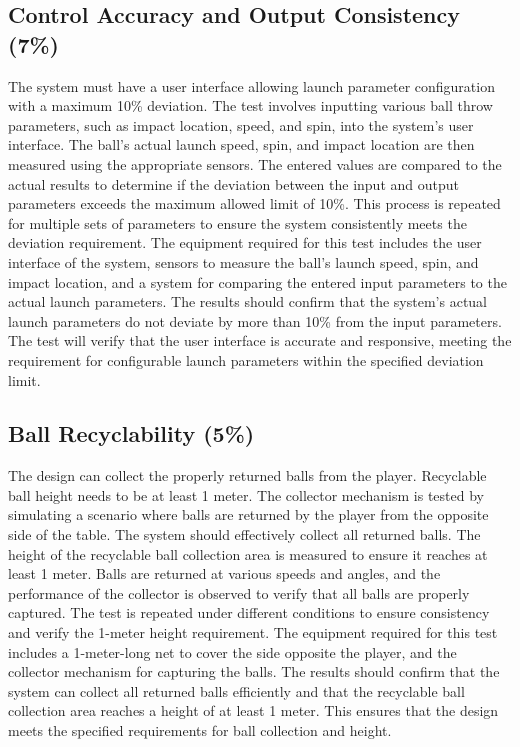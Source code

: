 \documentclass[12pt]{report}
\begin{document}
\subsection{Control Accuracy and Output Consistency (7\%)}
The system must have a user interface allowing launch parameter configuration with a maximum 10\% deviation. The test involves inputting various ball throw parameters, such as impact location, speed, and spin, into the system’s user interface. The ball's actual launch speed, spin, and impact location are then measured using the appropriate sensors. The entered values are compared to the actual results to determine if the deviation between the input and output parameters exceeds the maximum allowed limit of 10\%. This process is repeated for multiple sets of parameters to ensure the system consistently meets the deviation requirement. The equipment required for this test includes the user interface of the system, sensors to measure the ball's launch speed, spin, and impact location, and a system for comparing the entered input parameters to the actual launch parameters. The results should confirm that the system's actual launch parameters do not deviate by more than 10\% from the input parameters. The test will verify that the user interface is accurate and responsive, meeting the requirement for configurable launch parameters within the specified deviation limit.
\subsection{Ball Recyclability (5\%)}
The design can collect the properly returned balls from the player. Recyclable ball height needs to be at least 1 meter. The collector mechanism is tested by simulating a scenario where balls are returned by the player from the opposite side of the table. The system should effectively collect all returned balls. The height of the recyclable ball collection area is measured to ensure it reaches at least 1 meter. Balls are returned at various speeds and angles, and the performance of the collector is observed to verify that all balls are properly captured. The test is repeated under different conditions to ensure consistency and verify the 1-meter height requirement. The equipment required for this test includes a 1-meter-long net to cover the side opposite the player, and the collector mechanism for capturing the balls. The results should confirm that the system can collect all returned balls efficiently and that the recyclable ball collection area reaches a height of at least 1 meter. This ensures that the design meets the specified requirements for ball collection and height.
\end{document}
